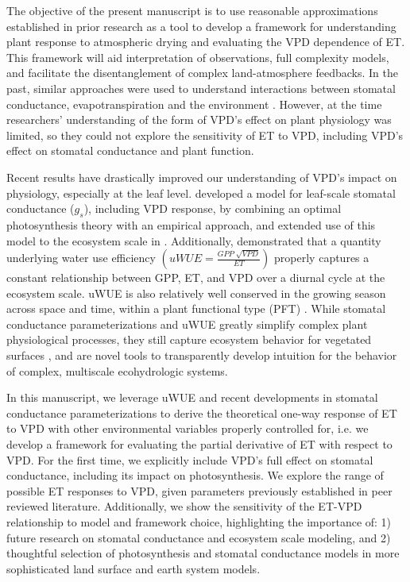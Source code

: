 The objective of the present manuscript is to use reasonable
approximations established in prior research as a tool to develop a
framework for understanding plant response to atmospheric drying and
evaluating the VPD dependence of ET. This framework will aid
interpretation of observations, full complexity models, and facilitate
the disentanglement of complex land-atmosphere feedbacks. In the past,
similar approaches were used to understand interactions between
stomatal conductance, evapotranspiration and the environment
\citep[e.g.,][]{Jarvis_1986, Mcnaughton_1991}. However, at the time
researchers' understanding of the form of VPD's effect on plant
physiology was limited, so they could not explore the sensitivity of
ET to VPD, including VPD's effect on stomatal conductance and plant
function.

Recent results have drastically improved our understanding of VPD's
impact on physiology, especially at the leaf
level. \citet{MEDLYN_2011} developed a model for leaf-scale stomatal
conductance ($g_s$), including VPD response, by combining an optimal
photosynthesis theory \citep{Cowan_1977} with an empirical approach,
and extended use of this model to the ecosystem scale in
\citet{Medlyn_2017}. Additionally, \citet{Zhou_2014} demonstrated that
a quantity underlying water use efficiency $\left(uWUE = \frac{GPP\;
\sqrt{VPD}}{ET}\right)$ properly captures a constant relationship
between GPP, ET, and VPD over a diurnal cycle at the ecosystem
scale. uWUE is also relatively well conserved in the growing season
across space and time, within a plant functional type (PFT)
\citep{Zhou_2015}. While stomatal conductance parameterizations and
uWUE greatly simplify complex plant physiological processes, they
still capture ecosystem behavior for vegetated surfaces
\citep{Medlyn_2017, Zhou_2014}, and are novel tools to transparently
develop intuition for the behavior of complex, multiscale
ecohydrologic systems.

In this manuscript, we leverage uWUE and recent developments in
stomatal conductance parameterizations \citep{MEDLYN_2011} to derive
the theoretical one-way response of ET to VPD with other environmental
variables properly controlled for, i.e. we develop a framework for
evaluating the partial derivative of ET with respect to VPD. For the
first time, we explicitly include VPD's full effect on stomatal
conductance, including its impact on photosynthesis. We explore the
range of possible ET responses to VPD, given parameters previously
established in peer reviewed literature. Additionally, we show the
sensitivity of the ET-VPD relationship to model and framework choice,
highlighting the importance of: 1) future research on stomatal
conductance and ecosystem scale modeling, and 2) thoughtful selection
of photosynthesis and stomatal conductance models in more
sophisticated land surface and earth system models.
